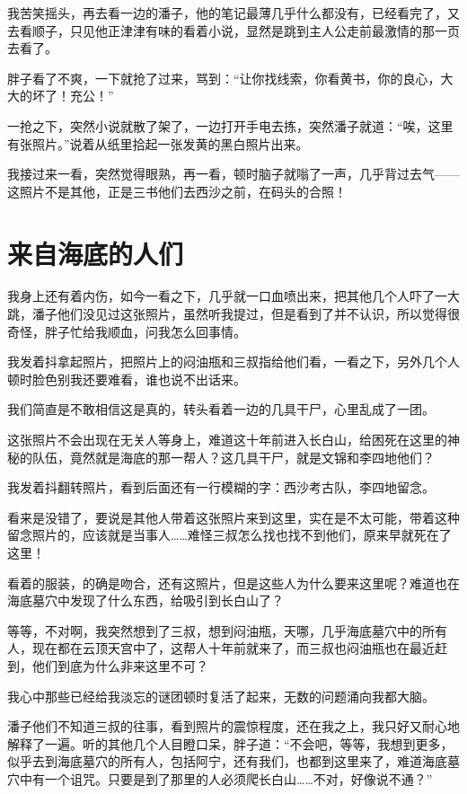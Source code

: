 我苦笑摇头，再去看一边的潘子，他的笔记最薄几乎什么都没有，已经看完了，又去看顺子，只见他正津津有味的看着小说，显然是跳到主人公走前最激情的那一页去看了。

胖子看了不爽，一下就抢了过来，骂到：“让你找线索，你看黄书，你的良心，大大的坏了！充公！”

一抢之下，突然小说就散了架了，一边打开手电去拣，突然潘子就道：“唉，这里有张照片。”说着从纸里拾起一张发黄的黑白照片出来。

我接过来一看，突然觉得眼熟，再一看，顿时脑子就嗡了一声，几乎背过去气——这照片不是其他，正是三书他们去西沙之前，在码头的合照！

\chapter{来自海底的人们}

我身上还有着内伤，如今一看之下，几乎就一口血喷出来，把其他几个人吓了一大跳，潘子他们没见过这张照片，虽然听我提过，但是看到了并不认识，所以觉得很奇怪，胖子忙给我顺血，问我怎么回事情。

我发着抖拿起照片，把照片上的闷油瓶和三叔指给他们看，一看之下，另外几个人顿时脸色别我还要难看，谁也说不出话来。

我们简直是不敢相信这是真的，转头看着一边的几具干尸，心里乱成了一团。

这张照片不会出现在无关人等身上，难道这十年前进入长白山，给困死在这里的神秘的队伍，竟然就是海底的那一帮人？这几具干尸，就是文锦和李四地他们？

我发着抖翻转照片，看到后面还有一行模糊的字：西沙考古队，李四地留念。

看来是没错了，要说是其他人带着这张照片来到这里，实在是不太可能，带着这种留念照片的，应该就是当事人……难怪三叔怎么找也找不到他们，原来早就死在了这里！

看着的服装，的确是吻合，还有这照片，但是这些人为什么要来这里呢？难道也在海底墓穴中发现了什么东西，给吸引到长白山了？

等等，不对啊，我突然想到了三叔，想到闷油瓶，天哪，几乎海底墓穴中的所有人，现在都在云顶天宫中了，这帮人十年前就来了，而三叔也闷油瓶也在最近赶到，他们到底为什么非来这里不可？

我心中那些已经给我淡忘的谜团顿时复活了起来，无数的问题涌向我都大脑。

潘子他们不知道三叔的往事，看到照片的震惊程度，还在我之上，我只好又耐心地解释了一遍。听的其他几个人目瞪口呆，胖子道：“不会吧，等等，我想到更多，似乎去到海底墓穴的所有人，包括阿宁，还有我们，也都到这里来了，难道海底墓穴中有一个诅咒。只要是到了那里的人必须爬长白山……不对，好像说不通？”

